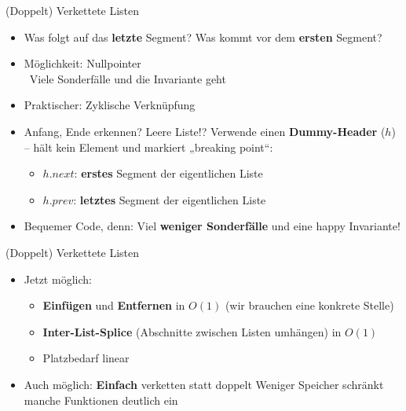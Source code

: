 \begin{frame}{(Doppelt) Verkettete Listen}
	\begin{itemize}
		\item Was folgt auf das \textbf{letzte} Segment? Was kommt vor dem \textbf{ersten} Segment?
		\pause
		\item Möglichkeit: Nullpointer \\
		\pause
		\hanging \Cons \ Viele Sonderfälle und die Invariante geht  \frownie
		\pause
		\item Praktischer: Zyklische Verknüpfung
		\pause
		\item Anfang, Ende erkennen? Leere Liste!?
		\pause
		\implitem Verwende einen \textbf{Dummy-Header} ($h$) – hält kein Element und markiert „breaking point“:
		\pause
		\begin{itemize}
			\item $h.next$: \textbf{erstes} Segment der eigentlichen Liste
			\item $h.prev$: \textbf{letztes} Segment der eigentlichen Liste
		\end{itemize}
		\pause
		\item[\Pros] Bequemer Code, denn: Viel \textbf{weniger Sonderfälle} und eine happy Invariante! \smiley
	\end{itemize}
\end{frame}

\begin{frame}{(Doppelt) Verkettete Listen}
	\begin{itemize}
		\item Jetzt möglich:
		\pause
		\begin{itemize}
			\item \textbf{Einfügen} und \textbf{Entfernen} in $O(1)$ (wir brauchen eine konkrete Stelle)
			\pause 
			\item \textbf{Inter-List-Splice} (Abschnitte zwischen Listen umhängen) in $O(1)$
			\pause
			\item Platzbedarf linear
		\end{itemize}
		\pause
		\item Auch möglich: \textbf{Einfach} verketten statt doppelt \impl Weniger Speicher \newline \impl schränkt manche Funktionen deutlich ein
	\end{itemize}
\end{frame}

